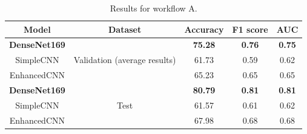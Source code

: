 \documentclass[runningheads]{llncs}
\begin{document}
\begin{table}[H]
\caption{Results for workflow A.}
\centering
\begin{tabular}{|c|c|c|c|c|}
\hline
Model       & Dataset    & Accuracy & F1 score & AUC \\ \hline
\textbf{DenseNet169} &            &     \textbf{75.28}        &    \textbf{0.76}    &   \textbf{0.75}  \\ \cline{1-1} \cline{3-5} 
SimpleCNN   & Validation (average results) &      61.73     &      0.59    &   0.62  \\ \cline{1-1} \cline{3-5} 
EnhancedCNN &            &        65.23          &     0.65     &   0.65  \\ \hline
\textbf{DenseNet169} &            &      \textbf{80.79}        &    \textbf{0.81}      &   \textbf{0.81} \\ \cline{1-1} \cline{3-5} 
SimpleCNN   & Test       &       61.57       &     0.61    &   0.62 \\ \cline{1-1} \cline{3-5} 
EnhancedCNN &            &          67.98        &     0.68     &   0.68  \\ \hline
\end{tabular}
\label{ResultsB}
\end{table}
\end{document}
